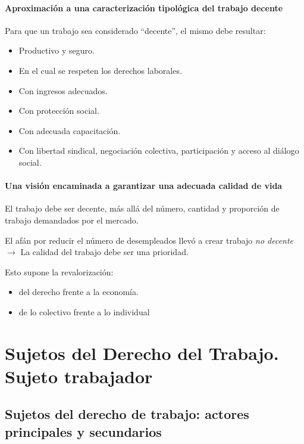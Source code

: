 \documentclass[spanish,12pt,a4paper,titlepage]{report}
\begin{document}
\subsubsection{Aproximación a una caracterización tipológica del trabajo decente}
\label{sec:Aproximacion-a-una-caracterizacion-tipologica-del-trabajo-decente}

Para que un trabajo sea considerado “decente”, el mismo debe resultar:
\begin{itemize}
\item Productivo y seguro.
\item En el cual se respeten los derechos laborales.
\item Con ingresos adecuados.
\item Con protección social.
\item Con adecuada capacitación.
\item Con libertad sindical, negociación colectiva, participación y acceso al diálogo social.
\end{itemize}

\subsubsection{Una visión encaminada a garantizar una adecuada calidad de vida }
\label{sec:Una-vision-encaminada-a-garantizar-una-adecuada-calidad-de-vida-}

El trabajo debe ser decente, más allá del número, cantidad y proporción de trabajo demandados por el mercado.

El afán por reducir el número de desempleados llevó a crear trabajo \textit{no decente} $\rightarrow$ La calidad del trabajo debe ser una prioridad.

Esto supone la revalorización:
\begin{itemize}
\item del derecho frente a la economía.
\item de lo colectivo frente a lo individual
\end{itemize}


\chapter{Sujetos del Derecho del Trabajo. Sujeto trabajador}
\section{Sujetos del derecho de trabajo: actores principales y secundarios}
\end{document}
